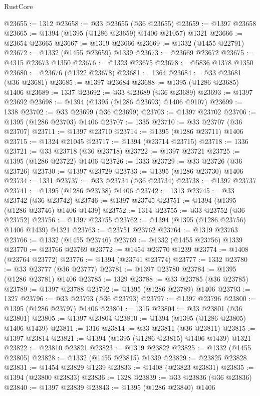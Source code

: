 \begin{lexlean}{RustCore}
\begin{coremodule}
@23655 := 1312
@23658 := @33 @23655 (@36 @23655)
@23659 := @1397 @23658
@23665 := @1394 (@1395 (@1286 @23659) @1406 @21057) @1321
@23666 := @23654 @23665
@23667 := @1319 @23666
@23669 := @1332 (@1455 @22791)
@23672 := @1332 (@1455 @23659) @1339
@23673 := @23669 @23672
@23675 := @4315 @23673 @1350
@23676 := @1323 @23675
@23678 := @5836 @1378 @1350
@23680 := @23676 (@1322 @23678)
@23681 := 1364
@23684 := @33 @23681 (@36 @23681)
@23685 := @1397 @23684
@23688 := @1395 (@1286 @23685) @1406
@23689 := 1337
@23692 := @33 @23689 (@36 @23689)
@23693 := @1397 @23692
@23698 := @1394 (@1395 (@1286 @23693) @1406 @9107)
@23699 := 1338
@23702 := @33 @23699 (@36 @23699)
@23703 := @1397 @23702
@23706 := @1395 (@1286 @23703) @1406
@23707 := 1335
@23710 := @33 @23707 (@36 @23707)
@23711 := @1397 @23710
@23714 := @1395 (@1286 @23711) @1406
@23715 := @1324 @21045
@23717 := @1394 (@23714 @23715)
@23718 := 1336
@23721 := @33 @23718 (@36 @23718)
@23722 := @1397 @23721
@23725 := @1395 (@1286 @23722) @1406
@23726 := 1333
@23729 := @33 @23726 (@36 @23726)
@23730 := @1397 @23729
@23733 := @1395 (@1286 @23730) @1406
@23734 := 1331
@23737 := @33 @23734 (@36 @23734)
@23738 := @1397 @23737
@23741 := @1395 (@1286 @23738) @1406
@23742 := 1313
@23745 := @33 @23742 (@36 @23742)
@23746 := @1397 @23745
@23751 := @1394 (@1395 (@1286 @23746) @1406 @1439)
@23752 := 1314
@23755 := @33 @23752 (@36 @23752)
@23756 := @1397 @23755
@23762 := @1394 (@1395 (@1286 @23756) @1406 @1439) @1321
@23763 := @23751 @23762
@23764 := @1319 @23763
@23766 := @1332 (@1455 @23746)
@23769 := @1332 (@1455 @23756) @1339
@23770 := @23766 @23769
@23772 := @1454 @23770 @1239
@23774 := @1408 (@23764 @23772)
@23776 := @1394 (@23741 @23774)
@23777 := 1332
@23780 := @33 @23777 (@36 @23777)
@23781 := @1397 @23780
@23784 := @1395 (@1286 @23781) @1406
@23785 := 1329
@23788 := @33 @23785 (@36 @23785)
@23789 := @1397 @23788
@23792 := @1395 (@1286 @23789) @1406
@23793 := 1327
@23796 := @33 @23793 (@36 @23793)
@23797 := @1397 @23796
@23800 := @1395 (@1286 @23797) @1406
@23801 := 1315
@23804 := @33 @23801 (@36 @23801)
@23805 := @1397 @23804
@23810 := @1394 (@1395 (@1286 @23805) @1406 @1439)
@23811 := 1316
@23814 := @33 @23811 (@36 @23811)
@23815 := @1397 @23814
@23821 := @1394 (@1395 (@1286 @23815) @1406 @1439) @1321
@23822 := @23810 @23821
@23823 := @1319 @23822
@23825 := @1332 (@1455 @23805)
@23828 := @1332 (@1455 @23815) @1339
@23829 := @23825 @23828
@23831 := @1454 @23829 @1239
@23833 := @1408 (@23823 @23831)
@23835 := @1394 (@23800 @23833)
@23836 := 1328
@23839 := @33 @23836 (@36 @23836)
@23840 := @1397 @23839
@23843 := @1395 (@1286 @23840) @1406

\end{coremodule}
\end{lexlean}
